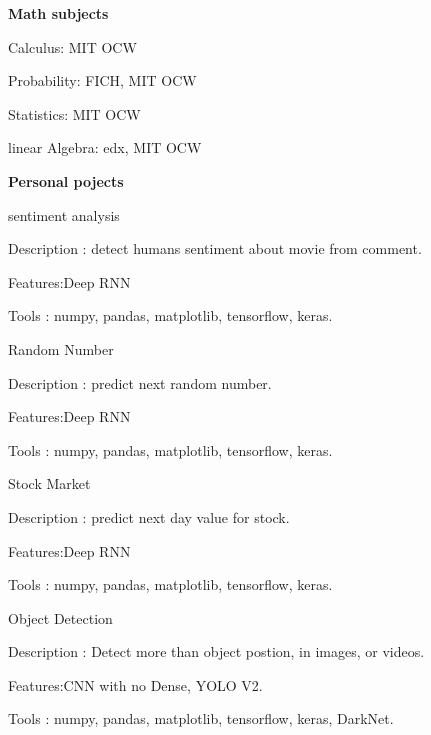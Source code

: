 \documentclass[a4paper,13pt,final]{memoir}
\newcommand{\Sep}{\vspace{1.5em}}
\newcommand{\SmallSep}{\vspace{0.5em}}
\newcommand{\CVSection}[1]
	{\Large\textbf{#1}\par
	\SmallSep\normalsize\normalfont}
\newcommand{\CVItem}[1]
	{\textbf{\color{RoyalBlue} #1}}
\begin{document}
\CVItem{Math subjects}
\begin{compactitem}[\color{RoyalBlue}$\circ$]
	\item Calculus: MIT OCW
	\item Probability: FICH, MIT OCW
	\item Statistics: MIT OCW
	\item linear Algebra: edx, MIT OCW
\end{compactitem}
\SmallSep
\Sep


\clearpage

\CVSection{Personal pojects}
\begin{compactitem}[\color{RoyalBlue}$\circ$]
		\item sentiment analysis
	\begin{compactitem}[\color{RoyalBlue}$\circ$]
		\item Description : detect humans sentiment about movie from comment.
		\item Features:Deep RNN
		\item Tools : numpy, pandas, matplotlib, tensorflow, keras.
	\end{compactitem}
	\SmallSep
	
	\item Random Number
	\begin{compactitem}[\color{RoyalBlue}$\circ$]
		\item Description : predict next random number.
		\item Features:Deep RNN
		\item Tools : numpy, pandas, matplotlib, tensorflow, keras.
	\end{compactitem}
	\SmallSep
	
	\item Stock Market
	\begin{compactitem}[\color{RoyalBlue}$\circ$]
		\item Description : predict next day value for stock.
		\item Features:Deep RNN
		\item Tools : numpy, pandas, matplotlib, tensorflow, keras.
	\end{compactitem}
	\SmallSep
	
		\item Object Detection
	\begin{compactitem}[\color{RoyalBlue}$\circ$]
		\item Description : Detect more than object postion, in images, or videos.
		\item Features:CNN with no Dense, YOLO V2.
		\item Tools :  numpy, pandas, matplotlib, tensorflow, keras, DarkNet.
	\end{compactitem}
	\SmallSep


\end{compactitem}
\end{document}
